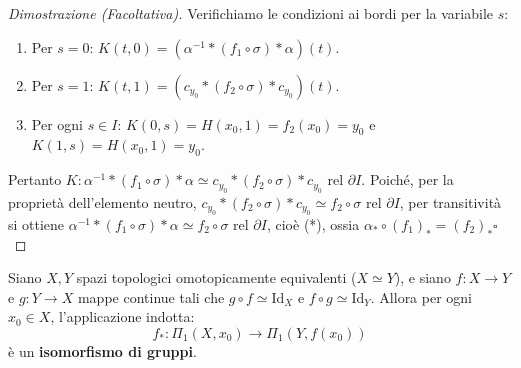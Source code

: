 \begin{proof}[Dimostrazione (Facoltativa)]
Verifichiamo le condizioni ai bordi per la variabile $s$:
\begin{enumerate}[label=\roman*)]
    \item Per $s = 0$: $K(t,0) = (\alpha^{-1} * (f_1 \circ \sigma) * \alpha)(t)$.
    \item Per $s = 1$: $K(t,1) = (c_{y_0} * (f_2 \circ \sigma) * c_{y_0})(t)$.
    \item Per ogni $s \in I$: $K(0,s) = H(x_0, 1) = f_2(x_0) = y_0$ e $K(1,s) = H(x_0, 1) = y_0$.
\end{enumerate}
Pertanto $K: \alpha^{-1} * (f_1 \circ \sigma) * \alpha \simeq c_{y_0} * (f_2 \circ \sigma) * c_{y_0} \text{ rel } \partial I$. Poich\'e, per la propriet\`a dell'elemento neutro, $c_{y_0} * (f_2 \circ \sigma) * c_{y_0} \simeq f_2 \circ \sigma \text{ rel } \partial I$, per transitivit\`a si ottiene $\alpha^{-1} * (f_1 \circ \sigma) * \alpha \simeq f_2 \circ \sigma \text{ rel } \partial I$, cio\`e (*), ossia $\alpha_* \circ (f_1)_* = (f_2)_*$\hfill$\square$
\end{proof}

\vspace{1.5em}

\begin{teo}
Siano $X, Y$ spazi topologici omotopicamente equivalenti ($X \simeq Y$), e siano $f: X \to Y$ e $g: Y \to X$ mappe continue tali che $g \circ f \simeq \mathrm{Id}_X$ e $f \circ g \simeq \mathrm{Id}_Y$.
Allora per ogni $x_0 \in X$, l'applicazione indotta:
\[
f_*: \Pi_1(X, x_0) \longrightarrow \Pi_1(Y, f(x_0))
\]
è un \textbf{isomorfismo di gruppi}.
\end{teo}

